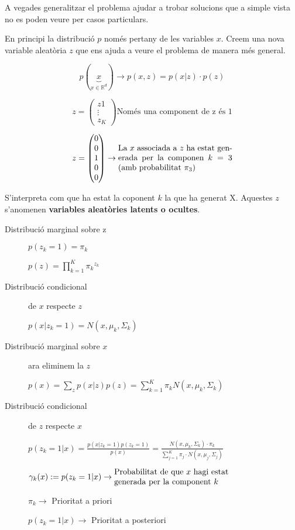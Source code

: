 \documentclass[a4paper]{article}
\begin{document}
A vegades generalitzar el problema ajudar a trobar solucions que a simple vista no es poden veure per casos particulars. 

En principi la distribució $p$ només pertany de les variables $x$. Creem una nova variable aleatòria $z$ que ens ajuda a veure el problema de manera més general.

$$
p(\underbrace{x}_{x \in \mathbb{R}^d}) \rightarrow p(x,z) = p(x|z)·p(z)
$$

$$ 
z = 
\begin{pmatrix}
z1 \\ \vdots \\ z_K
\end{pmatrix} \text{Només una component de z és 1} 
$$

$$
z = 
\begin{pmatrix}
0 \\
0 \\
1 \\
0 \\
0
\end{pmatrix}
\rightarrow
\parbox{14em}{La $x$ associada a $z$ ha estat generada per la componen $k=3$ (amb probabilitat $\pi_3$)}
$$

S'interpreta com que ha estat la coponent $k$ la que ha generat X. Aquestes $z$ s'anomenen \textbf{variables aleatòries latents o ocultes}.

\begin{description}
	\item[Distribució marginal sobre z] $p(z_k = 1) = \pi_k$
	
	$p(z) = \prod_{k=1}^K {\pi_k}^{z_k}$
	
	\item[Distribució condicional] de $x$ respecte $z$
	
	$p(x|z_k = 1) = N(x, \mu_k, \Sigma_k)$
	
	\item[Distribució marginal sobre $x$] ara eliminem la $z$
	
	$p(x) = \sum_z p(x|z)p(z) = \sum_{k=1}^K \pi_k N(x, \mu_k, \Sigma_k)$
	
	\item[Distribució condicional] de $z$ respecte $x$
	
	$p(z_k = 1|x) = \frac{p(x|z_k = 1)p(z_k = 1)}{p(x)} = 
	\frac{N(x, \mu_k, \Sigma_k)·\pi_k}{\sum_{j=1}^K \pi_j · N(x, \mu_j, \Sigma_j)}$
	
	$\gamma_k(x) := p(z_k = 1 | x) \rightarrow \parbox{14em}{Probabilitat de que $x$ hagi estat generada per la component $k$ }$
	
	$\pi_k \rightarrow$ Prioritat a priori
	
	$p(z_k = 1 | x) \rightarrow$ Prioritat a posteriori
\end{description}
\end{document}

